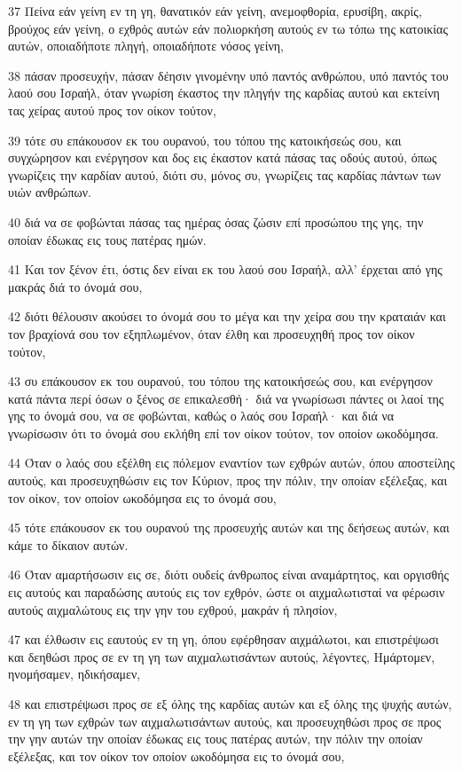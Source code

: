 \par 37 Πείνα εάν γείνη εν τη γη, θανατικόν εάν γείνη, ανεμοφθορία, ερυσίβη, ακρίς, βρούχος εάν γείνη, ο εχθρός αυτών εάν πολιορκήση αυτούς εν τω τόπω της κατοικίας αυτών, οποιαδήποτε πληγή, οποιαδήποτε νόσος γείνη,
\par 38 πάσαν προσευχήν, πάσαν δέησιν γινομένην υπό παντός ανθρώπου, υπό παντός του λαού σου Ισραήλ, όταν γνωρίση έκαστος την πληγήν της καρδίας αυτού και εκτείνη τας χείρας αυτού προς τον οίκον τούτον,
\par 39 τότε συ επάκουσον εκ του ουρανού, του τόπου της κατοικήσεώς σου, και συγχώρησον και ενέργησον και δος εις έκαστον κατά πάσας τας οδούς αυτού, όπως γνωρίζεις την καρδίαν αυτού, διότι συ, μόνος συ, γνωρίζεις τας καρδίας πάντων των υιών ανθρώπων.
\par 40 διά να σε φοβώνται πάσας τας ημέρας όσας ζώσιν επί προσώπου της γης, την οποίαν έδωκας εις τους πατέρας ημών.
\par 41 Και τον ξένον έτι, όστις δεν είναι εκ του λαού σου Ισραήλ, αλλ' έρχεται από γης μακράς διά το όνομά σου,
\par 42 διότι θέλουσιν ακούσει το όνομά σου το μέγα και την χείρα σου την κραταιάν και τον βραχίονά σου τον εξηπλωμένον, όταν έλθη και προσευχηθή προς τον οίκον τούτον,
\par 43 συ επάκουσον εκ του ουρανού, του τόπου της κατοικήσεώς σου, και ενέργησον κατά πάντα περί όσων ο ξένος σε επικαλεσθή· διά να γνωρίσωσι πάντες οι λαοί της γης το όνομά σου, να σε φοβώνται, καθώς ο λαός σου Ισραήλ· και διά να γνωρίσωσιν ότι το όνομά σου εκλήθη επί τον οίκον τούτον, τον οποίον ωκοδόμησα.
\par 44 Όταν ο λαός σου εξέλθη εις πόλεμον εναντίον των εχθρών αυτών, όπου αποστείλης αυτούς, και προσευχηθώσιν εις τον Κύριον, προς την πόλιν, την οποίαν εξέλεξας, και τον οίκον, τον οποίον ωκοδόμησα εις το όνομά σου,
\par 45 τότε επάκουσον εκ του ουρανού της προσευχής αυτών και της δεήσεως αυτών, και κάμε το δίκαιον αυτών.
\par 46 Όταν αμαρτήσωσιν εις σε, διότι ουδείς άνθρωπος είναι αναμάρτητος, και οργισθής εις αυτούς και παραδώσης αυτούς εις τον εχθρόν, ώστε οι αιχμαλωτισταί να φέρωσιν αυτούς αιχμαλώτους εις την γην του εχθρού, μακράν ή πλησίον,
\par 47 και έλθωσιν εις εαυτούς εν τη γη, όπου εφέρθησαν αιχμάλωτοι, και επιστρέψωσι και δεηθώσι προς σε εν τη γη των αιχμαλωτισάντων αυτούς, λέγοντες, Ημάρτομεν, ηνομήσαμεν, ηδικήσαμεν,
\par 48 και επιστρέψωσι προς σε εξ όλης της καρδίας αυτών και εξ όλης της ψυχής αυτών, εν τη γη των εχθρών των αιχμαλωτισάντων αυτούς, και προσευχηθώσι προς σε προς την γην αυτών την οποίαν έδωκας εις τους πατέρας αυτών, την πόλιν την οποίαν εξέλεξας, και τον οίκον τον οποίον ωκοδόμησα εις το όνομά σου,
